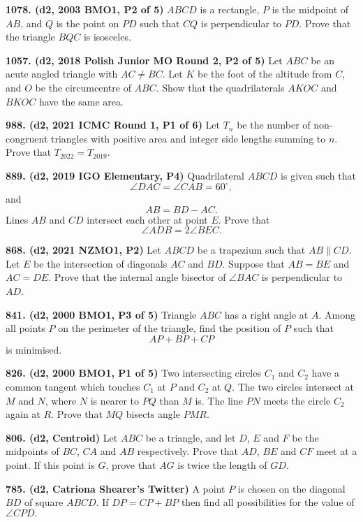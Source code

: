 \documentclass{article}
\begin{document}
\textbf{1078. (\color{red}d2\color{black}, 2003 BMO1, P2 of 5)} $ABCD$ is a rectangle, $P$ is the midpoint of $AB$, and $Q$ is the point on $PD$ such that $CQ$ is perpendicular to $PD$. Prove that the triangle $BQC$ is isosceles.

\textbf{1057. (\color{red}d2\color{black}, 2018 Polish Junior MO Round 2, P2 of 5)} Let $ABC$ be an acute angled triangle with $AC \ne BC$. Let $K$ be the foot of the altitude from $C$, and $O$ be the circumcentre of $ABC$. Show that the quadrilaterals $AKOC$ and $BKOC$ have the same area.

\textbf{988. (\color{red}d2\color{black}, 2021 ICMC Round 1, P1 of 6)} Let $T_{n}$ be the number of non-congruent triangles with positive area and integer side lengths summing to $n$. Prove that $T_{2022}=T_{2019}$.

\textbf{889. (\color{red}d2\color{black}, 2019 IGO Elementary, P4)} Quadrilateral $ABCD$ is given such that $$\angle DAC = \angle CAB = 60^\circ,$$ and
$$AB = BD - AC.$$ Lines $AB$ and $CD$ intersect each other at point $E$. Prove that \[
    \angle ADB = 2\angle BEC.\]

\textbf{868. (\color{red}d2\color{black}, 2021 NZMO1, P2)} Let \(ABCD\) be a trapezium such that \(AB \parallel CD\). Let \(E\) be the intersection of diagonals \(AC\) and \(BD\). Suppose that \(AB = BE\) and \(AC = DE\). Prove that the internal angle bisector of \(\angle BAC\) is perpendicular to \(AD\).

\textbf{841. (\color{red}d2\color{black}, 2000 BMO1, P3 of 5)} Triangle $ABC$ has a right angle at $A$. Among all points $P$ on the perimeter of the triangle, find the position of $P$ such that $$AP+BP+CP$$ is minimised.

\textbf{826. (\color{red}d2\color{black}, 2000 BMO1, P1 of 5)} Two intersecting circles $C_1$ and $C_2$ have a common tangent which touches $C_1$ at $P$ and $C_2$ at $Q$. The two circles intersect at $M$ and $N$, where $N$ is nearer to $PQ$ than $M$ is. The line $PN$ meets the circle $C_2$ again at $R$. Prove that $MQ$ bisects angle $PMR$.

\textbf{806. (\color{red}d2\color{black}, Centroid)} Let $ABC$ be a triangle, and let $D$, $E$ and $F$ be the midpoints of $BC$, $CA$ and $AB$ respectively. Prove that $AD$, $BE$ and $CF$ meet at a point. If this point is $G$, prove that $AG$ is twice the length of $GD$.

\textbf{785. (\color{red}d2\color{black}, Catriona Shearer's Twitter)} A point $P$ is chosen on the diagonal $BD$ of square $ABCD.$ If $DP = CP + BP$ then find all possibilities for the value of $\angle CPD.$
\end{document}
